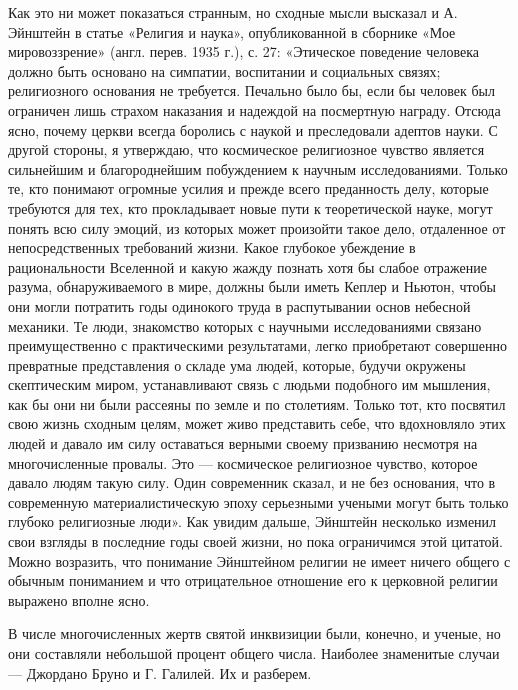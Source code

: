 Как это ни  может показаться странным, но сходные мысли  высказал и А.
Эйнштейн в  статье «Религия и  наука», опубликованной в  сборнике «Мое
мировоззрение»  (англ. перев.  1935 г.),  с. 27:  «Этическое поведение
человека  должно быть  основано на  симпатии, воспитании  и социальных
связях; религиозного основания не требуется. Печально было бы, если бы
человек был ограничен лишь страхом  наказания и надеждой на посмертную
награду.  Отсюда  ясно,  почему  церкви всегда  боролись  с  наукой  и
преследовали  адептов  науки.  С  другой  стороны,  я  утверждаю,  что
космическое религиозное  чувство является сильнейшим  и благороднейшим
побуждением к научным исследованиями. Только те, кто понимают огромные
усилия и прежде всего преданность делу, которые требуются для тех, кто
прокладывает  новые  пути  к  теоретической науке,  могут  понять  всю
силу  эмоций,  из  которых  может  произойти  такое  дело,  отдаленное
от  непосредственных  требований  жизни. Какое  глубокое  убеждение  в
рациональности  Вселенной  и  какую   жажду  познать  хотя  бы  слабое
отражение разума, обнаруживаемого  в мире, должны были  иметь Кеплер и
Ньютон, чтобы они могли потратить  годы одинокого труда в распутывании
основ  небесной  механики.  Те  люди, знакомство  которых  с  научными
исследованиями связано  преимущественно с  практическими результатами,
легко  приобретают совершенно  превратные представления  о складе  ума
людей,  которые,  будучи  окружены скептическим  миром,  устанавливают
связь с людьми  подобного им мышления, как бы они  ни были рассеяны по
земле  и по  столетиям. Только  тот, кто  посвятил свою  жизнь сходным
целям,  может живо  представить  себе, что  вдохновляло  этих людей  и
давало  им  силу  оставаться  верными  своему  призванию  несмотря  на
многочисленные  провалы.  Это  ---  космическое  религиозное  чувство,
которое давало  людям такую  силу. Один современник  сказал, и  не без
основания,  что  в  современную  материалистическую  эпоху  серьезными
учеными  могут  быть  только  глубоко религиозные  люди».  Как  увидим
дальше,  Эйнштейн  несколько изменил  свои  взгляды  в последние  годы
своей  жизни,  но  пока  ограничимся этой  цитатой.  Можно  возразить,
что  понимание Эйнштейном  религии не  имеет ничего  общего с  обычным
пониманием  и  что отрицательное  отношение  его  к церковной  религии
выражено вполне ясно.

В  числе  многочисленных  жертв  святой инквизиции  были,  конечно,  и
ученые,  но они  составляли небольшой  процент общего  числа. Наиболее
знаменитые случаи --- Джордано Бруно и Г. Галилей. Их и разберем.

